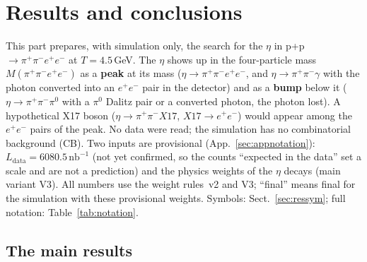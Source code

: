 \documentclass[11pt,a4paper]{article}
\newcommand{\piz}{\ensuremath{\pi^{0}}\xspace}
\newcommand{\ee}{\ensuremath{e^{+}e^{-}}\xspace}
\newcommand{\pipi}{\ensuremath{\pi^{+}\pi^{-}}\xspace}
\newcommand{\ppee}{\ensuremath{\pi^{+}\pi^{-}e^{+}e^{-}}\xspace}
\newcommand{\Mfour}{\ensuremath{M(\pi^{+}\pi^{-}e^{+}e^{-})}\xspace}
\newcommand{\nbinv}{\ensuremath{\mathrm{nb}^{-1}}\xspace}
\newcommand{\Ldata}{\ensuremath{L_{\mathrm{data}}}\xspace}
\begin{document}
\tableofcontents

\section{Results and conclusions}
\label{sec:results}
This part prepares, with simulation only, the search for the $\eta$ in p+p $\to\ppee$ at $T = 4.5$\,GeV. The $\eta$
shows up in the four-particle mass \Mfour as a \textbf{peak} at its mass ($\eta\to\ppee$, and $\eta\to\pipi\gamma$ with
the photon converted into an \ee pair in the detector) and as a \textbf{bump} below it ($\eta\to\pipi\piz$ with a \piz
Dalitz pair or a converted photon, the photon lost). A hypothetical X17 boson ($\eta\to\pipi X17$, $X17\to\ee$) would
appear among the \ee pairs of the peak. No data were read; the simulation has no combinatorial background (CB). Two
inputs are provisional (App.~\ref{sec:appnotation}): $\Ldata = 6080.5\,\nbinv$ (not yet confirmed, so the counts
``expected in the data'' set a scale and are not a prediction) and the physics weights of the $\eta$ decays (main
variant V3). All numbers use
the weight rules~v2 and V3; ``final'' means final for the simulation with these provisional weights. Symbols:
Sect.~\ref{sec:ressym}; full notation: Table~\ref{tab:notation}.

\subsection{The main results}
\label{sec:resmain}
\end{document}
